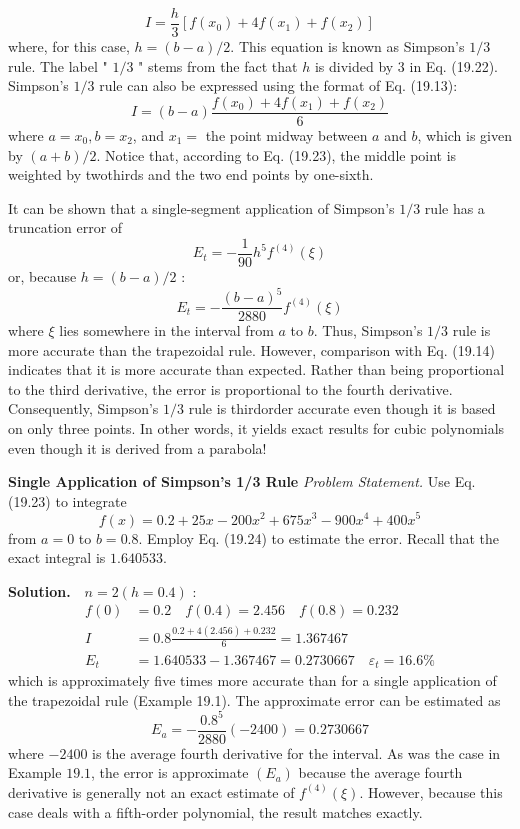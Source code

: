 \documentclass[../main.tex]{subfiles}
\begin{document}
	\begin{equation}
		\tag{19.22}
	I=\frac{h}{3}\left[f\left(x_{0}\right)+4 f\left(x_{1}\right)+f\left(x_{2}\right)\right]
\end{equation}
	where, for this case, $h=(b-a) / 2$. This equation is known as Simpson's $1 / 3$ rule. The label " $1 / 3$ " stems from the fact that $h$ is divided by 3 in Eq. (19.22). Simpson's $1 / 3$ rule can also be expressed using the format of Eq. (19.13):
	\begin{equation}
		\tag{19.23}
	I=(b-a) \frac{f\left(x_{0}\right)+4 f\left(x_{1}\right)+f\left(x_{2}\right)}{6}
\end{equation}
	where $a=x_{0}, b=x_{2}$, and $x_{1}=$ the point midway between $a$ and $b$, which is given by $(a+b) / 2$. Notice that, according to Eq. (19.23), the middle point is weighted by twothirds and the two end points by one-sixth.
	
	It can be shown that a single-segment application of Simpson's $1 / 3$ rule has a truncation error of
	$$
	E_{t}=-\frac{1}{90} h^{5} f^{(4)}(\xi)
	$$
	or, because $h=(b-a) / 2$ :
	\begin{equation}
		\tag{19.24}
	E_{t}=-\frac{(b-a)^{5}}{2880} f^{(4)}(\xi)
\end{equation}
	where $\xi$ lies somewhere in the interval from $a$ to $b$. Thus, Simpson's $1 / 3$ rule is more accurate than the trapezoidal rule. However, comparison with Eq. (19.14) indicates that it is more accurate than expected. Rather than being proportional to the third derivative, the error is proportional to the fourth derivative. Consequently, Simpson's $1 / 3$ rule is thirdorder accurate even though it is based on only three points. In other words, it yields exact results for cubic polynomials even though it is derived from a parabola!

	\begin{exmp} \textbf{Single Application of Simpson's 1/3 Rule}
		\noindent\textit{Problem Statement.} Use Eq. (19.23) to integrate
		$$
f(x)=0.2+25 x-200 x^{2}+675 x^{3}-900 x^{4}+400 x^{5}
$$
from $a=0$ to $b=0.8$. Employ Eq. (19.24) to estimate the error. Recall that the exact integral is $1.640533$.

		\noindent \textbf{Solution.}$\quad n=2(h=0.4)$ :
		$$
		\begin{aligned}
		f(0) &=0.2 \quad f(0.4)=2.456 \quad f(0.8)=0.232 \\
		I &=0.8 \frac{0.2+4(2.456)+0.232}{6}=1.367467 \\
		E_{t} &=1.640533-1.367467=0.2730667 \quad \varepsilon_{t}=16.6 \%
		\end{aligned}
		$$
		which is approximately five times more accurate than for a single application of the trapezoidal rule (Example 19.1). The approximate error can be estimated as
		$$
		E_{a}=-\frac{0.8^{5}}{2880}(-2400)=0.2730667
		$$
		where $-2400$ is the average fourth derivative for the interval. As was the case in Example $19.1$, the error is approximate $\left(E_{a}\right)$ because the average fourth derivative is generally not an exact estimate of $f^{(4)}(\xi)$. However, because this case deals with a fifth-order polynomial, the result matches exactly.
	\end{exmp}
\end{document}
